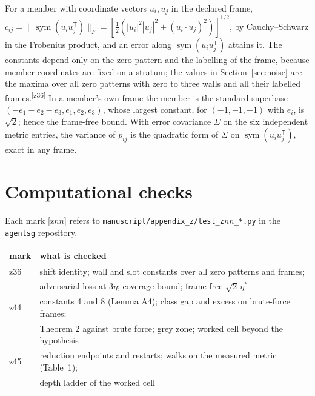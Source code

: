 \documentclass[preprint,pdf]{iucr}          %
\newcommand{\sym}{\operatorname{sym}}
\newcommand{\chk}[1]{\textsuperscript{[#1]}}
\begin{document}
For a member with coordinate vectors $u_i,u_j$ in the declared frame, $c_{ij}=\|\sym(u_iu_j^{\mathsf T})\|_F=[\tfrac12(|u_i|^2|u_j|^2+(u_i\cdot u_j)^2)]^{1/2}$, by Cauchy--Schwarz in the Frobenius product, and an error along $\sym(u_iu_j^{\mathsf T})$ attains it. The constants depend only on the zero pattern and the labelling of the frame, because member coordinates are fixed on a stratum; the values in Section~\ref{sec:noise} are the maxima over all zero patterns with zero to three walls and all their labelled frames.\chk{z36} In a member's own frame the member is the standard superbase $(-e_1-e_2-e_3,e_1,e_2,e_3)$, whose largest constant, for $(-1,-1,-1)$ with $e_i$, is $\sqrt2$; hence the frame-free bound. With error covariance $\Sigma$ on the six independent metric entries, the variance of $p_{ij}$ is the quadratic form of $\Sigma$ on $\sym(u_iu_j^{\mathsf T})$, exact in any frame.

\section{Computational checks}

Each mark [z$nn$] refers to \texttt{manuscript/appendix\_z/test\_z$nn$\_*.py} in the \texttt{agentsg} repository.

\begin{tabular}{ll}
\toprule
mark & what is checked \\
\midrule
z36 & shift identity; wall and slot constants over all zero patterns and frames; \\
    & adversarial loss at $3\eta$; coverage bound; frame-free $\sqrt2\,\eta^*$ \\
z44 & constants 4 and 8 (Lemma A4); class gap and excess on brute-force frames; \\
    & Theorem 2 against brute force; grey zone; worked cell beyond the hypothesis \\
z45 & reduction endpoints and restarts; walks on the measured metric (Table~1); \\
    & depth ladder of the worked cell \\
\bottomrule
\end{tabular}

\begin{references}
\end{references}
\end{document}
